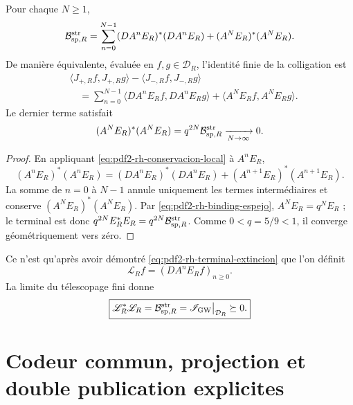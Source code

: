\begin{proposition}
\label{prop:pdf2-rh-telescopia}
Pour chaque \(N\geq1\),
\begin{equation}\label{eq:pdf2-rh-telescopia-finita}
 \mathcal B_{{\rm sp},R}^{\rm str}
 =\sum_{n=0}^{N-1}(DA^nE_R)^*(DA^nE_R)
 +(A^NE_R)^*(A^NE_R).
\end{equation}
De manière équivalente, évaluée en \(f,g\in\mathcal D_R\), l'identité finie de
la colligation est
\begin{equation}\label{eq:pdf2-rh-balance-finito-columnas}
\boxed{
\begin{aligned}
 &\langle J_{+,R}f,J_{+,R}g\rangle
  -\langle J_{-,R}f,J_{-,R}g\rangle\\
 &\quad=\sum_{n=0}^{N-1}
  \langle DA^nE_Rf,DA^nE_Rg\rangle
  +\langle A^NE_Rf,A^NE_Rg\rangle.
\end{aligned}}
\end{equation}
Le dernier terme satisfait
\begin{equation}\label{eq:pdf2-rh-terminal-extincion}
 (A^NE_R)^*(A^NE_R)
 =q^{2N}\mathcal B_{{\rm sp},R}^{\rm str}
 \xrightarrow[N\to\infty]{}0.
\end{equation}
\end{proposition}

\begin{proof}
En appliquant \eqref{eq:pdf2-rh-conservacion-local} à \(A^nE_R\),
\[
 (A^nE_R)^*(A^nE_R)
 =(DA^nE_R)^*(DA^nE_R)
 +(A^{n+1}E_R)^*(A^{n+1}E_R).
\]
La somme de \(n=0\) à \(N-1\) annule uniquement les termes intermédiaires et
conserve \((A^NE_R)^*(A^NE_R)\). Par
\eqref{eq:pdf2-rh-binding-espejo}, \(A^NE_R=q^NE_R\) ; le terminal
est donc \(q^{2N}E_R^*E_R=q^{2N}\mathcal B_{{\rm sp},R}^{\rm str}\). Comme
\(0<q=5/9<1\), il converge géométriquement vers zéro.
\end{proof}

Ce n'est qu'après avoir démontré \eqref{eq:pdf2-rh-terminal-extincion} que l'on définit
\begin{equation}\label{eq:pdf2-rh-l-r}
 \mathscr L_Rf=(DA^nE_Rf)_{n\geq0}.
\end{equation}
La limite du télescopage fini donne
\begin{equation}\label{eq:pdf2-rh-lstar-l}
 \boxed{
 \mathscr L_R^*\mathscr L_R
 =\mathcal B_{{\rm sp},R}^{\rm str}
 =\mathscr I_{\rm GW}\big|_{\mathcal D_R}\succeq0.}
\end{equation}

\section{Codeur commun, projection et double publication explicites}

